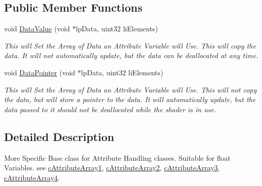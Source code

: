 \subsection*{Public Member Functions}
\begin{DoxyCompactItemize}
\item 
\hypertarget{classc_float_attribute_store_af9721a74ced818c5ae1aee3043b9a6bb}{
void \hyperlink{classc_float_attribute_store_af9721a74ced818c5ae1aee3043b9a6bb}{DataValue} (void $\ast$lpData, uint32 liElements)}
\label{classc_float_attribute_store_af9721a74ced818c5ae1aee3043b9a6bb}

\begin{DoxyCompactList}\small\item\em This will Set the Array of Data an Attribute Variable will Use. This will copy the data. It will not automatically update, but the data can be deallocated at any time. \end{DoxyCompactList}\item 
\hypertarget{classc_float_attribute_store_a930627974932e8bca72f6c4dd70c68a8}{
void \hyperlink{classc_float_attribute_store_a930627974932e8bca72f6c4dd70c68a8}{DataPointer} (void $\ast$lpData, uint32 liElements)}
\label{classc_float_attribute_store_a930627974932e8bca72f6c4dd70c68a8}

\begin{DoxyCompactList}\small\item\em This will Set the Array of Data an Attribute Variable will Use. This will not copy the data, but will store a pointer to the data. It will automatically update, but the data passed to it should not be deallocated while the shader is in use. \end{DoxyCompactList}\end{DoxyCompactItemize}


\subsection{Detailed Description}
More Specific Base class for Attribute Handling classes. Suitable for float Variables. see \hyperlink{classc_attribute_array1}{cAttributeArray1}, \hyperlink{classc_attribute_array2}{cAttributeArray2}, \hyperlink{classc_attribute_array3}{cAttributeArray3}, \hyperlink{classc_attribute_array4}{cAttributeArray4}. 